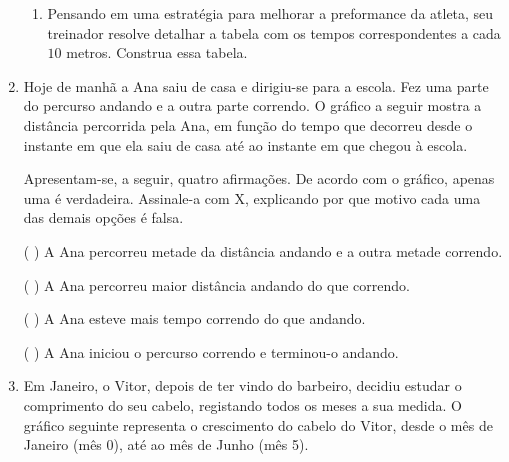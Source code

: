 \begin{enumerate}
\begin{enumerate}
\item {} 
Pensando em uma estratégia para melhorar a preformance da atleta, seu treinador resolve detalhar a tabela com os tempos correspondentes a cada \(10\) metros. Construa essa tabela.

\end{enumerate}

\item Hoje de manhã a Ana saiu de casa e dirigiu-se para a escola. Fez uma parte do percurso andando e a outra parte correndo. O gráfico a seguir mostra a distância percorrida pela Ana, em função do tempo que decorreu desde o instante em que ela saiu de casa até ao instante em que chegou à escola.
\begin{center}\end{center}
Apresentam-se, a seguir, quatro afirmações. De acordo com o gráfico, apenas uma é verdadeira. Assinale-a com X, explicando por que motivo cada uma das demais opções é falsa.

(    ) A Ana percorreu metade da distância andando e a outra metade correndo.

(    ) A Ana percorreu maior distância andando do que correndo.

(    ) A Ana esteve mais tempo correndo do que andando.

(    ) A Ana iniciou o percurso correndo e terminou-o andando.

\item Em Janeiro, o Vitor, depois de ter vindo do barbeiro, decidiu estudar o comprimento do seu cabelo, registando todos os meses a sua medida. O gráfico seguinte representa o crescimento do cabelo do Vitor, desde o mês de Janeiro (mês 0), até ao mês de Junho (mês 5).
\label{\detokenize{AF106-E1:fig-cabelo}}


\end{enumerate}
